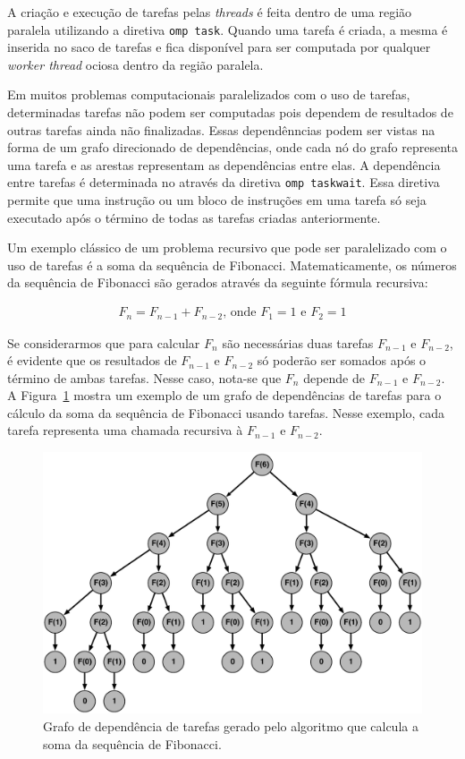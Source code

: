 \documentclass{SBCbookchapter}
\begin{document}
	A criação e execução de tarefas pelas \textit{threads} é feita
	dentro de uma região paralela utilizando a diretiva \texttt{omp
	task}. Quando uma tarefa é criada, a mesma é inserida no saco de
	tarefas e fica disponível para ser computada por qualquer
	\textit{worker thread} ociosa dentro da região paralela.

	Em muitos problemas computacionais paralelizados com o uso de
	tarefas, determinadas tarefas não podem ser computadas pois dependem
	de resultados de outras tarefas ainda não finalizadas. Essas
	dependênncias podem ser vistas na forma de um grafo direcionado de
	dependências, onde cada nó do grafo representa uma tarefa e as
	arestas representam as dependências entre elas. A dependência entre
	tarefas é determinada no \openmp através da diretiva \texttt{omp
	taskwait}. Essa diretiva permite que uma instrução ou um bloco de
	instruções em uma tarefa só seja executado após o término de todas
	as tarefas criadas anteriormente.
	
	Um exemplo clássico de um problema recursivo que pode ser
	paralelizado com o uso de tarefas é a soma da sequência de
	Fibonacci. Matematicamente, os números da sequência de Fibonacci são
	gerados através da seguinte fórmula recursiva:
	
	\begin{align*}
		F_n = F_{n-1} + F_{n-2} \text{, onde } F_1=1 \text{ e } F_2=1
	\end{align*}

	Se considerarmos que para calcular $F_n$ são necessárias duas
	tarefas $F_{n-1}$ e $F_{n-2}$, é evidente que os resultados de
	$F_{n-1}$ e $F_{n-2}$ só poderão ser somados após o término de ambas
	tarefas. Nesse caso, nota-se que $F_n$ depende de $F_{n-1}$ e
	$F_{n-2}$. A Figura~\ref{fig:fibonacci} mostra um exemplo de um
	grafo de dependências de tarefas para o cálculo da soma da sequência
	de Fibonacci usando tarefas. Nesse exemplo, cada tarefa representa
	uma chamada recursiva à $F_{n-1}$ e $F_{n-2}$.

		\begin{figure}[t]
			\centering
			\includegraphics[width=0.8\linewidth]{img/fibonacci}
			\caption{Grafo de dependência de tarefas gerado pelo algoritmo que calcula a soma da sequência
			de Fibonacci.}\label{fig:fibonacci}
		\end{figure}
\end{document}
